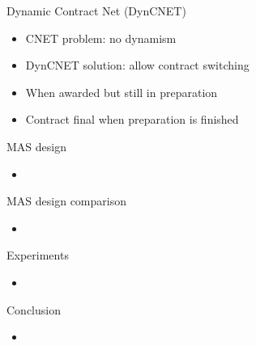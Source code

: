 \documentclass{beamer}
\begin{document}
	\begin{frame}{Dynamic Contract Net (DynCNET)}
		\begin{itemize}
			\item CNET problem: no dynamism
			\item DynCNET solution: allow contract switching
			\item When awarded but still in preparation
			\item Contract final when preparation is finished
		\end{itemize}
	\end{frame}
	
	\begin{frame}{MAS design}
		\begin{itemize}
			\item
		\end{itemize}
	\end{frame}
	
	\begin{frame}{MAS design comparison}
		\begin{itemize}
			\item
		\end{itemize}
	\end{frame}
	
	\begin{frame}{Experiments}
		\begin{itemize}
			\item
		\end{itemize}
	\end{frame}
	
	\begin{frame}{Conclusion}
		\begin{itemize}
			\item
		\end{itemize}
	\end{frame}
	
\end{document}

